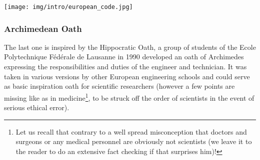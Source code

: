 	\begin{center}
		\texttt{[image: img/intro/european\_code.jpg]}
	\end{center}
	
	\pagebreak
	\subsubsection{Archimedean Oath}
	The last one is inspired by the Hippocratic Oath, a group of students of the Ecole Polytechnique Fédérale de Lausanne in 1990 developed an oath of Archimedes expressing the responsibilities and duties of the engineer and technician. It was taken in various versions by other European engineering schools and could serve as basic inspiration oath for scientific researchers (however a few points are missing like as in medicine\footnote{Let us recall that contrary to a well spread misconception that doctors and surgeons or any medical personnel are obviously not scientists (we leave it to the reader to do an extensive fact checking if that surprises him)!}, to be struck off the order of scientists in the event of serious ethical error).

